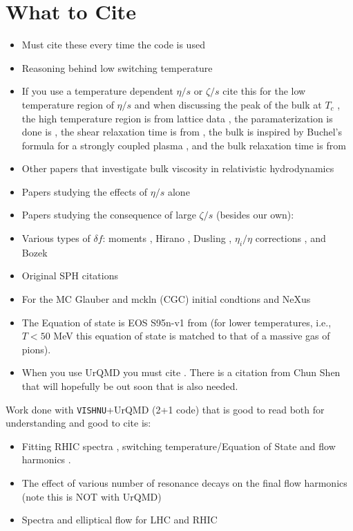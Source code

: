 \documentclass[article]{revtex4-1}
\newcommand{\nocode}[1]{\texttt{#1}}
\begin{document}
\section{What to Cite}\label{sec:cite}

\begin{itemize}
\item Must cite these every time the code is used \cite{code} 
\item Reasoning behind low switching temperature \cite{freezeouttemp} 
\item If you use a temperature dependent $\eta/s$ or $\zeta/s$ cite this for the low temperature region of $\eta/s$ and when discussing the peak of the bulk at $T_c$ \cite{lowetas}, the high temperature region is from lattice data \cite{Nakamura:2004sy}, the paramaterization is done is \cite{Niemi:2012ry}, the shear relaxation time is from \cite{Denicol:2010xn,Denicol:2011fa}, the bulk is inspired by Buchel's formula  for a strongly coupled plasma \cite{Buchel:2007mf}, and the bulk relaxation time is from \cite{Huang:2010sa}
\item Other papers that investigate bulk viscosity in relativistic hydrodynamics \cite{Song:2009rh,Bozek:2009dw,Monnai:2009ad,Denicol:2009am,Denicol:2010tr,Dusling:2011fd}
\item Papers studying the effects of $\eta/s$ alone \cite{etas}
\item Papers studying the consequence of large $\zeta/s$ (besides our own): \cite{Torrieri:2007fb,Rajagopal:2009yw,Habich:2014tpa}
\item Various types of $\delta f$: moments \cite%
{Denicol:2012cn,Denicol:2012yr,code}, Hirano \cite{Monnai:2009ad}, Dusling \cite{Dusling:2011fd}, $\eta_i/\eta$ corrections \cite{Molnar:2014fva}, and Bozek \cite{Bozek:2009dw}
\item Original SPH citations \cite{originalSPH,SPHothers,Aguiar:2000hw}
\item For the MC Glauber and mckln (CGC) initial condtions \cite{ic} and NeXus \cite{Drescher:2000ha}
\item The Equation of state is EOS S95n-v1 from  \cite{Huovinen:2009yb} (for lower temperatures, i.e., $T < 50$ MeV this equation of state is matched to that of a massive gas
of pions).  
\item When you use UrQMD you must cite \cite{urqmd}. There is a citation from Chun Shen that will hopefully be out soon that is also needed.
\end{itemize}

Work done with \nocode{VISHNU}+UrQMD (2+1 code) that is good to read both for understanding and good to cite is:
\begin{itemize}
\item Fitting RHIC spectra \cite{Song:2011hk}, switching temperature/Equation of State \cite{Song:2010aq} and flow harmonics \cite{Song:2010mg}.  
\item The effect of various number of resonance decays on the final flow harmonics \cite{Qiu:2012tm} (note this is NOT with UrQMD)
\item Spectra and elliptical flow for LHC and RHIC \cite{Song:2011qa,Song:2013qma}
\end{itemize}
\end{document}
